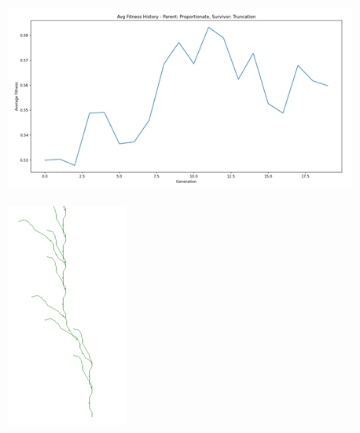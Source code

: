 \begin{figure}[H]
    \centering
    \begin{subfigure}[b]{0.3\textwidth}
        \includegraphics[width=\textwidth]{symbol.png}
    \end{subfigure}
    \begin{subfigure}[b]{0.1\textwidth}
        \includegraphics[width=\textwidth]{tree_sym.png}

\end{subfigure}
\end{figure}
